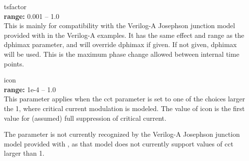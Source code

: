 \begin{description}
\item{\vt tsfactor}\\
{\bf range:} 0.001 -- 1.0\\
This is mainly for compatibility with the Verilog-A Josephson junction
model provided with {\WRspice} in the Verilog-A examples.  It has the
same effect and range as the {\WRspice} {\vt dphimax} parameter, and
will override {\vt dphimax} if given.  If not given, {\vt dphimax}
will be used.  This is the maximum phase change allowed between
internal time points.

\item{\vt icon}\\
{\bf range:} 1e-4 -- 1.0\\
This parameter applies when the {\vt cct} parameter is set to one of
the choices larger the 1, where critical current modulation is
modeled.  The value of {\vt icon} is the first value for (assumed)
full suppression of critical current.

The parameter is not currently recognized by the Verilog-A Josephson
junction model provided with {\WRspice}, as that model does not
currently support values of {\vt cct} larger than 1.
\end{description}


